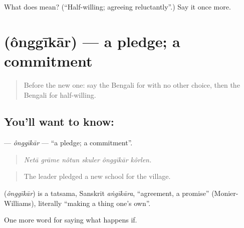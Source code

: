 \begin{tcolorbox}[breakable,colback=teal!4,colframe=teal!35!black,title={Before you move on}]
What does  mean? (\textquotedblleft{}Half-willing; agreeing reluctantly\textquotedblright{}.) Say it once more.
\end{tcolorbox}
\section[\texorpdfstring{\bn{অঙ্গীকার} (ônggīkār)}{অঙ্গীকার (ônggīkār)}]{ (ônggīkār) — a pledge; a commitment}

\label{lesson:BN-C537-onggikar}



\begin{quote}
Before the new one: say the Bengali for with no other choice, then the Bengali for half-willing.
\end{quote}

\subsection*{You'll want to know: }
\textbf{} — \emph{ônggīkār} — \textquotedblleft{}a pledge; a commitment\textquotedblright{}.

\begin{quote}
     
\end{quote}

\begin{quote}
\emph{Netā grāme nôtun skuler ônggīkār kôrlen.}
\end{quote}

\begin{quote}
The leader pledged a new school for the village.
\end{quote}

\begin{cousinweb}
\textbf{} (\emph{ônggīkār}) is a tatsama, Sanskrit \emph{aṅgīkāra}, \textquotedblleft{}agreement, a promise\textquotedblright{} (Monier-Williams), literally \textquotedblleft{}making a thing one's own\textquotedblright{}.
\end{cousinweb}

\begin{grammarlens}[title={What you've built}]
One more word for saying what happens if.
\end{grammarlens}

